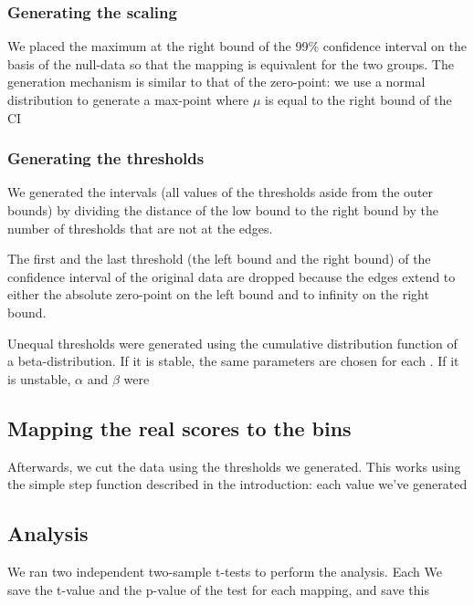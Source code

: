 \documentclass[utf8]{FrontiersinVancouver}
\begin{document}
\subsubsection{Generating the scaling}
We placed the maximum at the right bound of the 99\% confidence interval on the basis of the null-data so that the mapping is equivalent for the two groups. The generation mechanism is similar to that of the zero-point: we use a normal distribution to generate a max-point where $\mu$ is equal to the right bound of the CI 

\subsubsection{Generating the thresholds}
We generated the intervals (all values of the thresholds aside from the outer bounds) by dividing the distance of the low bound to the right bound by the number of thresholds that are not at the edges.

The first and the last threshold (the left bound and the right bound) of the confidence interval of the original data are dropped because the edges extend to either the absolute zero-point on the left bound and to infinity on the right bound.

Unequal thresholds were generated using the cumulative distribution function of a beta-distribution. If it is stable, the same parameters are chosen for each . If it is unstable, $\alpha$ and $\beta$ were 

\subsection{Mapping the real scores to the bins}
Afterwards, we cut the data using the thresholds we generated. This works using the simple step function described in the introduction: each value we've generated 

\subsection{Analysis}
We ran two independent two-sample t-tests to perform the analysis. Each We save the t-value and the p-value of the test for each mapping, and save this 
\end{document}
